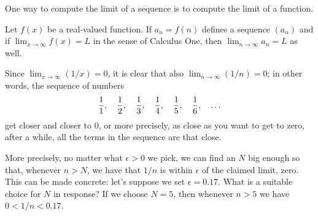\documentclass{ximera}
\newcommand{\ds}{\displaystyle}
\begin{document}

One way to compute the limit of a sequence is to compute the limit of
a function.
\begin{theorem}
  \label{theorem:compute-limit-of-sequence-via-function}
  Let $f(x)$ be a real-valued function.  If $a_n = f(n)$ defines a
  sequence $(a_n)$ and if $\ds \lim_{x\to\infty}f(x)=L$ in the sense of Calculus
  One, then $\ds \lim_{n\to\infty} a_n=L$ as well.
\end{theorem}

\begin{example}
\label{example:find-n-for-epsilon}
Since $\ds \lim_{x\to\infty}(1/x)=0$, it is
clear that also $\ds \lim_{n\to\infty}(1/n)=0$; in other words, the sequence of numbers
$${1\over1},\quad {1\over2},\quad {1\over3},\quad {1\over4},\quad {1\over5},\quad {1\over6},\quad \ldots$$
get closer and closer to 0, or more precisely, as close as you want to get to zero, after a while, all the terms in the sequence are that close.

More precisely, no matter what $\epsilon > 0$ we pick, we can find an
$N$ big enough so that, whenever $n > N$, we have that $1/n$ is within
$\epsilon$ of the claimed limit, zero.  This can be made concrete:
let's suppose we set $\epsilon = 0.17$.  What is a suitable choice for
$N$ in response?  If we choose $N = 5$, then whenever $n > 5$ we have
$0 < 1/n < 0.17$.
\end{example}

\end{document}

